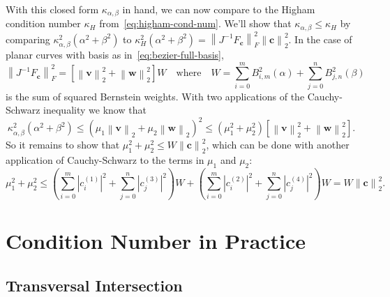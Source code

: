 \documentclass[3p, authoryear, square]{elsarticle}
\theoremstyle{definition}
\begin{document}
With this closed form \(\kappa_{\alpha, \beta}\) in hand, we can now compare
to the Higham condition number \(\kappa_H\) from~\eqref{eq:higham-cond-num}.
We'll show that \(\kappa_{\alpha, \beta} \leq \kappa_H\) by comparing
\(\kappa_{\alpha, \beta}^2 \left(\alpha^2 + \beta^2\right)\)
to \(\kappa_H^2 \left(\alpha^2 + \beta^2\right) = \left \lVert J^{-1}
F_{\bm{c}} \right \rVert_F^2 \left \lVert \bm{c} \right \rVert_2^2\).
In the case of planar curves with basis as in~\eqref{eq:bezier-full-basis},
\begin{equation}
  \left \lVert J^{-1} F_{\bm{c}} \right \rVert_F^2 =
  \left[\left \lVert \bm{v} \right \rVert_2^2 + \left \lVert \bm{w}
  \right \rVert_2^2 \right] W \quad \text{where} \quad W =
  \sum_{i = 0}^m B_{i, m}^2(\alpha) + \sum_{j = 0}^n B_{j, n}^2(\beta)
\end{equation}
is the sum of squared Bernstein weights.
With two applications of the Cauchy-Schwarz inequality we know that
\begin{equation}
  \kappa_{\alpha, \beta}^2 \left(\alpha^2 + \beta^2\right) \leq
  \left(\mu_1 \left \lVert \bm{v} \right \rVert_2 + \mu_2 \left \lVert \bm{w}
  \right \rVert_2\right)^2 \leq \left(\mu_1^2 + \mu_2^2\right) \left[
  \left \lVert \bm{v} \right \rVert_2^2 + \left \lVert \bm{w}
  \right \rVert_2^2 \right].
\end{equation}
So it remains to show that \(\mu_1^2 + \mu_2^2 \leq W \left \lVert \bm{c}
\right \rVert_2^2\), which can be done with another application of
Cauchy-Schwarz to the terms in \(\mu_1\) and \(\mu_2\):
\begin{equation}
  \mu_1^2 + \mu_2^2 \leq \left(\sum_{i = 0}^m \left|c_i^{(1)}\right|^2 +
  \sum_{j = 0}^n \left|c_j^{(3)}\right|^2 \right) W + \left(\sum_{i = 0}^m
  \left|c_i^{(2)}\right|^2 + \sum_{j = 0}^n \left|c_j^{(4)}\right|^2 \right) W
  = W \left \lVert \bm{c} \right \rVert_2^2.
\end{equation}

\section{Condition Number in Practice}

\subsection{Transversal Intersection}
\end{document}
